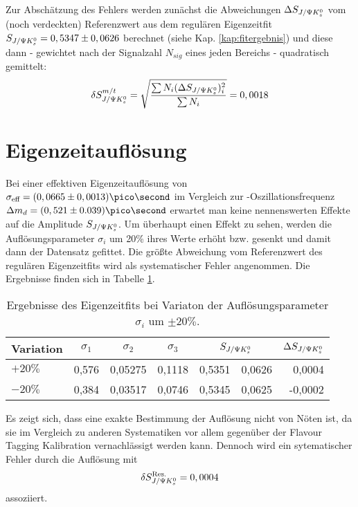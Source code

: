 Zur Abschätzung des Fehlers werden zunächst die Abweichungen $\Delta S_{J/\Psi K_s^0}$ vom (noch verdeckten) Referenzwert aus dem regulären Eigenzeitfit $S_{J/\Psi K_s^0} = 0,5347 \pm 0,0626$ berechnet (siehe Kap. \ref{kap:fitergebnis}) und diese dann - gewichtet nach der Signalzahl $N_{sig}$ eines jeden Bereichs - quadratisch gemittelt:
\begin{align}
\delta S_{J/\Psi K_s^0}^{m/t} = \sqrt{\frac{\sum N_i (\Delta S_{J/\Psi K_s^0})_i^2}{\sum N_i}} = 0,0018
\end{align}

\section{Eigenzeitauflösung} \label{kap:aufloesung}
Bei einer effektiven Eigenzeitauflösung von $\sigma_{\text{eff}} = (0,0665 \pm 0,0013)\ps$ im Vergleich zur \Bd-Oszillationsfrequenz $\Delta m_d = (0,521 \pm 0.039)\ps$ erwartet man keine nennenswerten Effekte auf die Amplitude $S_{J/\Psi K_s^0}$. Um überhaupt einen Effekt zu sehen, werden die Auflösungsparameter $\sigma_i$ um 20\% ihres Werte erhöht bzw. gesenkt und damit dann der Datensatz gefittet. Die größte Abweichung vom Referenzwert des regulären Eigenzeitfits wird als systematischer Fehler angenommen. Die Ergebnisse finden sich in Tabelle \ref{tab:syst_resolution}.

\begin{table}[hptb]
\centering
\caption{Ergebnisse des Eigenzeitfits bei Variaton der Auflösungsparameter $\sigma_i$ um $\pm 20\%$.}
\label{tab:syst_resolution}
\begin{tabular}{l c c c r@{$\pm$}l r }
\hline \hline
Variation & $\sigma_1$ & $\sigma_2$ & $\sigma_3$ & \multicolumn{2}{c}{$S_{J/\Psi K_s^0}$} & $\Delta S_{J/\Psi K_s^0}$ \\ \hline
$+20\%$ & 0,576 & 0,05275 & 0,1118 & 0,5351 & 0,0626 & 0,0004 \\
$-20\%$ & 0,384 & 0,03517 & 0,0746 & 0,5345 & 0,0625 & -0,0002 \\ \hline \hline
\end{tabular}
\end{table}
Es zeigt sich, dass eine exakte Bestimmung der Auflösung nicht von Nöten ist, da sie im Vergleich zu anderen Systematiken vor allem gegenüber der Flavour Tagging Kalibration vernachlässigt werden kann. Dennoch wird ein sytematischer Fehler durch die Auflösung mit
\begin{align}
\delta S_{J/\Psi K_s^0}^{\text{Res.}} = 0,0004
\end{align}
assoziiert.

